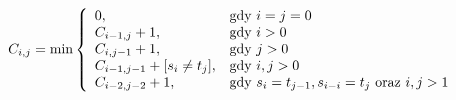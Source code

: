 \documentclass{praca1}
\begin{document}
\begin{equation}
\label{eq:007}
C_{i,j} = \min\left\{
\begin{array}{l l}     
    0, & \text{gdy } i = j = 0\\
    C_{i-1, j} + 1, & \text{gdy } i > 0 \\
    C_{i, j-1} + 1, & \text{gdy } j > 0 \\
    C_{i-1, j-1} + [s_{i}\neq t_{j}], & \text{gdy } i, j > 0 \\
    C_{i-2, j-2} + 1, & \text{gdy } s_i = t_{j-1}, s_{i-i} = t_j \text{ oraz } i,j > 1
\end{array}\right.
\end{equation}


%

\end{document}
